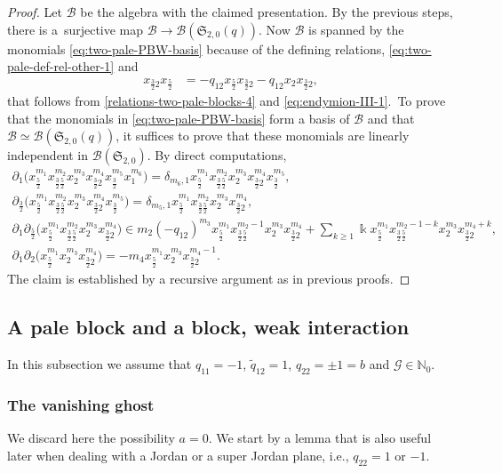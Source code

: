 \documentclass[pdftex]{sigma}
\numberwithin{equation}{section}
\newcommand{\toba}{\mathscr B}
\newcommand{\ghost}{\mathscr{G}}
\newcommand{\sele}{\mathfrak{S}}
\newcommand{\N}{{\mathbb N}}
\newcommand{\tresdos}{\frac{3}{2}}
\newcommand{\cincodos}{\frac{5}{2}}
\begin{document}
\begin{proof}
Let $\toba$ be the algebra with the claimed presentation. By the previous steps,
there is a~surjective map $\toba \to \toba(\sele_{2,0}(q))$.
Now $\toba$ is spanned by the monomials \eqref{eq:two-pale-PBW-basis} because of
the defining relations, \eqref{eq:two-pale-def-rel-other-1} and
\begin{align*}
x_{\tresdos2}x_{\cincodos} &= -q_{12} x_{\cincodos}x_{\tresdos2} - q_{12}x_{2}x_{\tresdos2},
\end{align*}
that follows from \eqref{relations-two-pale-blocks-4} and \eqref{eq:endymion-III-1}.\
To prove that the monomials in \eqref{eq:two-pale-PBW-basis} form a basis of $\toba$ and that
$\toba \simeq \toba(\sele_{2,0}(q))$, it suffices to prove that these monomials are linearly independent in $\toba(\sele_{2,0})$. By direct computations,
\begin{gather*}
\partial_1 \big(x_{\cincodos}^{m_1}x_{\tresdos\cincodos}^{m_2}x_{2}^{m_3}x_{\tresdos2}^{m_4} x_{\tresdos}^{m_5} x_1^{m_6}\big)
= \delta_{m_6,1} x_{\cincodos}^{m_1}x_{\tresdos\cincodos}^{m_2}x_{2}^{m_3}x_{\tresdos2}^{m_4} x_{\tresdos}^{m_5},
\\
\partial_{\tresdos} \big(x_{\cincodos}^{m_1}x_{\tresdos\cincodos}^{m_2}x_{2}^{m_3}x_{\tresdos2}^{m_4} x_{\tresdos}^{m_5} \big)
= \delta_{m_5,1} x_{\cincodos}^{m_1}x_{\tresdos\cincodos}^{m_2}x_{2}^{m_3}x_{\tresdos2}^{m_4},
\\
\partial_1\partial_{\cincodos} \big(x_{\cincodos}^{m_1}x_{\tresdos\cincodos}^{m_2}x_{2}^{m_3}x_{\tresdos2}^{m_4}\big)
\in m_2(-q_{12})^{m_3}x_{\cincodos}^{m_1}x_{\tresdos\cincodos}^{m_2-1}x_{2}^{m_3}x_{\tresdos2}^{m_4}
 + \sum_{k\ge1} \Bbbk x_{\cincodos}^{m_1}x_{\tresdos\cincodos}^{m_2-1-k}x_{2}^{m_3}x_{\tresdos2}^{m_4+k},
\\
\partial_1\partial_{2} \big(x_{\cincodos}^{m_1}x_{2}^{m_3}x_{\tresdos2}^{m_4}\big)
= -m_4x_{\cincodos}^{m_1}x_{2}^{m_3} x_{\tresdos2}^{m_4-1}.
\end{gather*}
The claim is established by a recursive argument as in previous proofs.
\end{proof}

\subsection{A pale block and a block, weak interaction}
In this subsection we assume that $q_{11}=- 1$,
$\widetilde{q}_{12} = 1$, $q_{22}=\pm 1=b$ and $\ghost \in \N_0$.

\subsubsection{The vanishing ghost}
We discard here the possibility $a=0$. We start by a lemma that is also useful later
when dealing with a Jordan or a super Jordan plane, i.e., $q_{22}= 1$ or $-1$.
\end{document}
